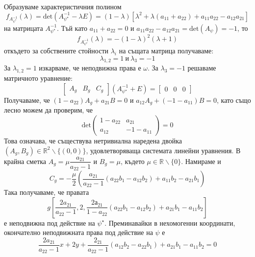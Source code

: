 \documentclass[12pt]{article}
\begin{document}
Образуваме характеристичния полином $$f_{A_{\psi^\star}^{-1}}(\lambda)=\mathrm{det}(A_{\psi^\star}^{-1}-\lambda E)=(1-\lambda)[\lambda^2+\lambda(a_{11}+a_{22})+a_{11}a_{22}-a_{12}a_{21}]$$ на матрицата $A_{\psi^\star}^{-1}$. Тъй като $a_{11}+a_{22}=0$ и $a_{11}a_{22}-a_{12}a_{21}=\mathrm{det}(A_\psi)=-1$, то $$f_{A_{\psi^\star}^{-1}}(\lambda)=-(1-\lambda)^2(\lambda+1)$$ откъдето за собствените стойности $\lambda_i$ на същата матрица получаваме: $$\lambda_{1,2}=1\ \text{и}\ \lambda_{3}=-1$$
За $\lambda_{1,2}=1$ изкарваме, че неподвижна права е $\omega$. За $\lambda_3=-1$ решаваме матричното уравнение: $$\begin{bmatrix} A_g & B_g & C_g\end{bmatrix}(A_{\psi^\star}^{-1}+E)=\begin{bmatrix} 0 & 0 & 0\end{bmatrix}$$ Получаваме, че $(1-a_{22})A_g+a_{21}B=0$ и $a_{12}A_g+(-1-a_{11})B=0$, като също лесно можем да проверим, че $$\mathrm{det}\begin{pmatrix} 1-a_{22} & a_{21} \\ a_{12} & -1-a_{11}\end{pmatrix}=0$$ Това означава, че съществува нетривиална наредена двойка $(A_g,B_g)\in\mathbb{R}^2\backslash\{(0,0)\}$, удовлетворяваща системата линейни уравнения. В крайна сметка $A_g=\mu \dfrac{a_{21}}{a_{22}-1}$ и $B_g=\mu$, където $\mu\in\mathbb{R}\backslash\{0\}$. Намираме и $$C_g=-\dfrac{\mu}{2}\left(\dfrac{a_{21}}{a_{22}-1}(a_{22}b_1-a_{12}b_2)+a_{11}b_2-a_{21}b_1\right)$$ Така получаваме, че правата $$g\left[\dfrac{2a_{21}}{a_{22}-1},2,\dfrac{2а_{21}}{1-a_{22}}(a_{22}b_1-a_{12}b_2)+a_{21}b_1-a_{11}b_2\right]$$ е неподвижна под действие на $\psi^\star$. Преминавайки в нехомогенни координати, окончателно неподвижната права под действие на $\psi$ е $$\dfrac{2a_{21}}{a_{22}-1}x+2y+\dfrac{2_{21}}{a_{22}-1}(a_{12}b_2-a_{22}b_1)+a_{21}b_1-a_{11}b_2=0$$
\par
\end{document}
